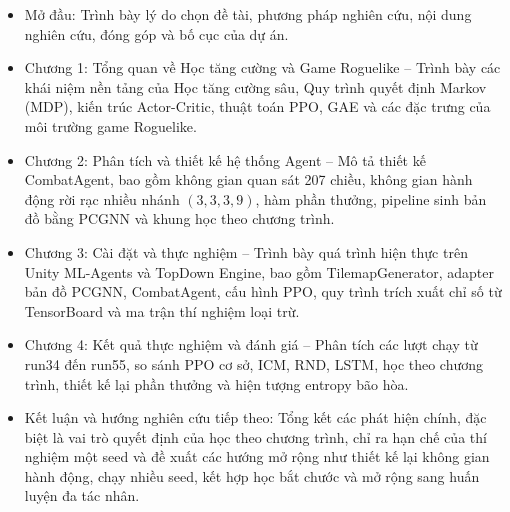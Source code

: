 \renewcommand{\labelitemi}{$-$}
\begin{itemize}
	\item Mở đầu: Trình bày lý do chọn đề tài, phương pháp nghiên cứu, nội dung nghiên cứu, đóng góp và bố cục của dự án.
	\item Chương 1: Tổng quan về Học tăng cường và Game Roguelike -- Trình bày các khái niệm nền tảng của Học tăng cường sâu, Quy trình quyết định Markov (MDP), kiến trúc Actor-Critic, thuật toán PPO, GAE và các đặc trưng của môi trường game Roguelike.
	\item Chương 2: Phân tích và thiết kế hệ thống Agent -- Mô tả thiết kế CombatAgent, bao gồm không gian quan sát 207 chiều, không gian hành động rời rạc nhiều nhánh $(3,3,3,9)$, hàm phần thưởng, pipeline sinh bản đồ bằng PCGNN và khung học theo chương trình.
	\item Chương 3: Cài đặt và thực nghiệm -- Trình bày quá trình hiện thực trên Unity ML-Agents và TopDown Engine, bao gồm TilemapGenerator, adapter bản đồ PCGNN, CombatAgent, cấu hình PPO, quy trình trích xuất chỉ số từ TensorBoard và ma trận thí nghiệm loại trừ.
    \item Chương 4: Kết quả thực nghiệm và đánh giá -- Phân tích các lượt chạy từ run34 đến run55, so sánh PPO cơ sở, ICM, RND, LSTM, học theo chương trình, thiết kế lại phần thưởng và hiện tượng entropy bão hòa.
	\item Kết luận và hướng nghiên cứu tiếp theo: Tổng kết các phát hiện chính, đặc biệt là vai trò quyết định của học theo chương trình, chỉ ra hạn chế của thí nghiệm một seed và đề xuất các hướng mở rộng như thiết kế lại không gian hành động, chạy nhiều seed, kết hợp học bắt chước và mở rộng sang huấn luyện đa tác nhân.
\end{itemize}
